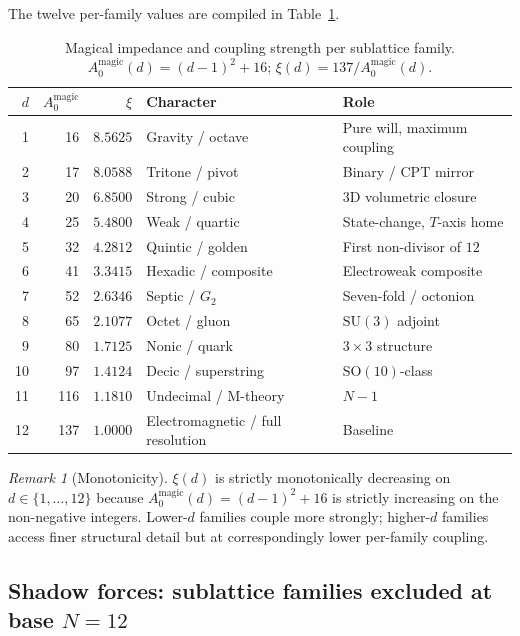 \documentclass[11pt,a4paper]{article}
\theoremstyle{definition}
\theoremstyle{remark}
\newtheorem{remark}[theorem]{Remark}
\begin{document}
The twelve per-family values are compiled in Table~\ref{tab:impedance}.
\begin{table}[h]
\centering
\caption{Magical impedance and coupling strength per sublattice family. $A_{0}^{\text{magic}}(d) = (d-1)^{2} + 16$; $\xi(d) = 137/A_{0}^{\text{magic}}(d)$.}
\label{tab:impedance}
\begin{tabular}{@{}rrrll@{}}
\toprule
$d$ & $A_{0}^{\text{magic}}$ & $\xi$ & Character & Role \\
\midrule
 1 &  16 & $8.5625$ & Gravity / octave                & Pure will, maximum coupling \\
 2 &  17 & $8.0588$ & Tritone / pivot                 & Binary / CPT mirror \\
 3 &  20 & $6.8500$ & Strong / cubic                  & $3$D volumetric closure \\
 4 &  25 & $5.4800$ & Weak / quartic                  & State-change, $T$-axis home \\
 5 &  32 & $4.2812$ & Quintic / golden                & First non-divisor of $12$ \\
 6 &  41 & $3.3415$ & Hexadic / composite             & Electroweak composite \\
 7 &  52 & $2.6346$ & Septic / $G_{2}$                & Seven-fold / octonion \\
 8 &  65 & $2.1077$ & Octet / gluon                   & $\mathrm{SU}(3)$ adjoint \\
 9 &  80 & $1.7125$ & Nonic / quark                   & $3 \times 3$ structure \\
10 &  97 & $1.4124$ & Decic / superstring             & $\mathrm{SO}(10)$-class \\
11 & 116 & $1.1810$ & Undecimal / M-theory            & $N{-}1$ \\
12 & 137 & $1.0000$ & Electromagnetic / full resolution & Baseline \\
\bottomrule
\end{tabular}
\end{table}

\begin{remark}[Monotonicity]
$\xi(d)$ is strictly monotonically decreasing on $d\in\{1,\ldots,12\}$ because $A_{0}^{\text{magic}}(d) = (d-1)^{2}+16$ is strictly increasing on the non-negative integers. Lower-$d$ families couple more strongly; higher-$d$ families access finer structural detail but at correspondingly lower per-family coupling.
\end{remark}

\subsection{Shadow forces: sublattice families excluded at base $N=12$}\label{subsec:shadow-forces}
\end{document}
